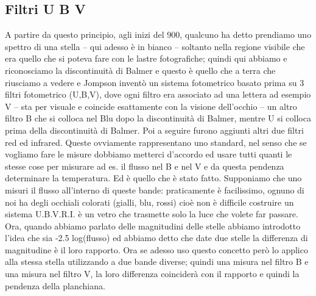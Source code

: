 \documentclass[a4paper,11pt]{article}
\begin{document}
\subsection{Filtri U B V}
A partire da questo principio, agli inizi del 900, qualcuno ha detto prendiamo uno spettro di una stella – qui adesso è in bianco – soltanto nella regione visibile che era quello che si poteva fare con le lastre fotografiche; quindi qui abbiamo e riconosciamo la discontinuità di Balmer e questo è quello che a terra che riusciamo a vedere e Jompson inventò un sistema fotometrico basato prima su 3 filtri fotometrico (U,B,V), dove ogni filtro era associato ad una lettera ad esempio  V – sta per visuale e coincide esattamente con la visione dell’occhio –  un altro filtro B che si colloca nel Blu dopo la discontinuità di Balmer, mentre U si colloca prima della discontinuità di Balmer. Poi a seguire furono aggiunti altri due filtri red ed infrared. Queste ovviamente rappresentano uno standard, nel senso che se vogliamo fare le misure dobbiamo metterci d’accordo ed usare tutti quanti le stesse cose per misurare ad es. il flusso nel B e nel V e da questa pendenza determinare la temperatura. Ed è quello che è stato fatto. 
\newline
Supponiamo che uno misuri il flusso all’interno di queste bande: praticamente è facilissimo, ognuno di noi ha degli occhiali colorati (gialli, blu, rossi) cioè non è difficile costruire un sistema U.B.V.R.I. è un vetro che trasmette solo la luce che volete far passare. Ora, quando abbiamo parlato delle magnitudini delle stelle abbiamo introdotto l’idea che sia -2.5 log(flusso) ed abbiamo detto che date due stelle la differenza di magnitudine è il loro rapporto. Ora se adesso uso questo concetto però lo applico alla stessa stella utilizzando a due bande diverse; quindi una misura nel filtro B e una misura nel filtro V, la loro differenza coinciderà con il rapporto e quindi la pendenza della planchiana. 
\newline
\end{document}
